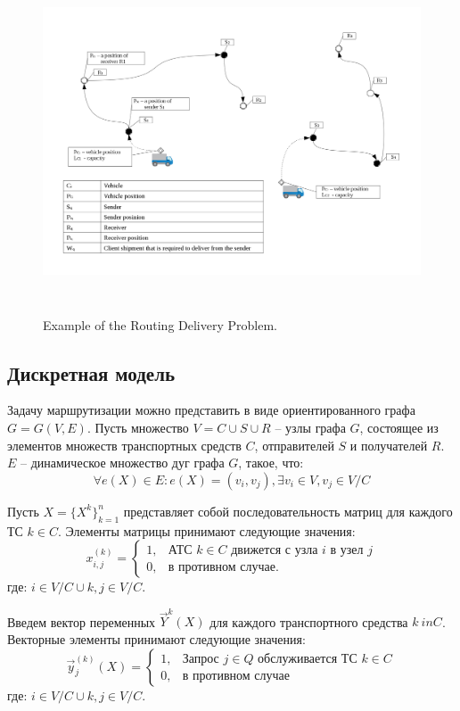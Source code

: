 \documentclass[]{TAACpaper}
\begin{document}
\begin{figure}[h]
	\hfil\includegraphics[height=4.0in]{images/scheme}\hfil
	\caption
	{
		Example of the Routing Delivery Problem.
	}
	\label{aba:fig1}
\end{figure}

\subsection{Дискретная модель}
Задачу маршрутизации можно представить в виде ориентированного графа $G=G(V,E)$. Пусть множество $V=C\cup{S}\cup{R}$ -- узлы графа $G$,  состоящее из элементов множеств транспортных средств $C$, отправителей $S$ и получателей $R$. $E$ -- динамическое множество дуг графа $G$, такое, что:
\begin{equation}
\forall e(X) \in E: e(X) = (v_i,v_j), \exists v_i \in V, v_j \in V/C
\end{equation}

Пусть $X = \{X^k\}^n_{k=1}$ представляет собой последовательность матриц для каждого ТС $k \in C$. Элементы матрицы принимают следующие значения:
\begin{equation}
  x^{(k)}_{i,j} = 
    \begin{cases}
	  1,&\text{АТС $k \in C$ движется с узла $i$ в узел $j$}\\
	  0,&\text{в противном случае.}
    \end{cases}
\end{equation}
где: $i\in{V/C \cup {k}}, j \in V/C$.

Введем вектор переменных $ \vec{Y}  ^ k(X) $ для каждого транспортного средства  $ k \ in C $. Векторные элементы принимают следующие значения:
\begin{equation}
\vec{y}^{(k)}_{j}(X) = 
\begin{cases}
1,&\text{Запрос $j \in Q$ обслуживается ТС $k \in C$}\\
0,&\text{в противном случае}
\end{cases}
\end{equation}
где: $i\in{V/C \cup {k}}, j \in V/C$.
\end{document}
